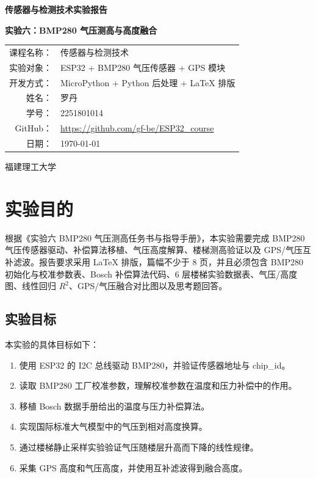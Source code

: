 \documentclass[UTF8,a4paper,12pt]{ctexart}
\begin{document}
\begin{titlepage}
\centering
\vspace*{2.2cm}
{\bfseries 传感器与检测技术实验报告\par}
\vspace{1.2cm}
{\bfseries 实验六：BMP280 气压测高与高度融合\par}
\vspace{2.2cm}
\begin{tabular}{rl}
课程名称：& 传感器与检测技术\\[0.6cm]
实验对象：& ESP32 + BMP280 气压传感器 + GPS 模块\\[0.6cm]
开发方式：& MicroPython + Python 后处理 + LaTeX 排版\\[0.6cm]
姓名：& 罗丹\\[0.6cm]
学号：& 2251801014\\[0.6cm]
GitHub：& \url{https://github.com/gf-be/ESP32_course}\\[0.6cm]
日期：& \today\\
\end{tabular}
\vfill
{福建理工大学\par}
\end{titlepage}

\tableofcontents
\clearpage

\section{实验目的}

根据《实验六 BMP280 气压测高任务书与指导手册》，本实验需要完成 BMP280 气压传感器驱动、补偿算法移植、气压高度解算、楼梯测高验证以及 GPS/气压互补滤波。报告要求采用 LaTeX 排版，篇幅不少于 8 页，并且必须包含 BMP280 初始化与校准参数表、Bosch 补偿算法代码、6 层楼梯实验数据表、气压/高度图、线性回归 $R^2$、GPS/气压融合对比图以及思考题回答。

\subsection{实验目标}

本实验的具体目标如下：
\begin{enumerate}
  \item 使用 ESP32 的 I2C 总线驱动 BMP280，并验证传感器地址与 chip\_id。
  \item 读取 BMP280 工厂校准参数，理解校准参数在温度和压力补偿中的作用。
  \item 移植 Bosch 数据手册给出的温度与压力补偿算法。
  \item 实现国际标准大气模型中的气压到相对高度换算。
  \item 通过楼梯静止采样实验验证气压随楼层升高而下降的线性规律。
  \item 采集 GPS 高度和气压高度，并使用互补滤波得到融合高度。
\end{enumerate}
\end{document}
